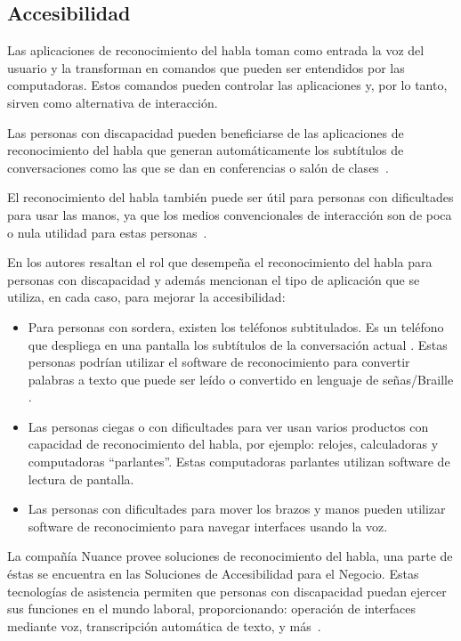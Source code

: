 \subsection{Accesibilidad}
\label{sec:accesibilidad}

Las aplicaciones de reconocimiento del habla toman como entrada la voz del usuario y la transforman en
comandos que pueden ser entendidos por las computadoras. Estos comandos pueden controlar las aplicaciones
y, por lo tanto, sirven como alternativa de interacci\'on.

Las personas con discapacidad pueden beneficiarse de las aplicaciones de reconocimiento del habla que
generan autom\'aticamente los subt\'itulos de conversaciones como las que se dan en conferencias o
sal\'on de \mbox{clases \cite{LeitchHow2002}.}

El reconocimiento del habla tambi\'en puede ser \'util para personas con dificultades para usar las manos, ya
que los medios convencionales de interacci\'on son de poca o nula utilidad para estas
\mbox{personas \cite{AnanthiSurvey2013}.}

En \cite{AnanthiSurvey2013} los autores resaltan el rol que desempe\~na el reconocimiento del habla para personas
con discapacidad y adem\'as mencionan el tipo de aplicaci\'on que se utiliza, en cada caso, para mejorar la accesibilidad:

\begin{itemize}
    \item Para personas con sordera, existen los tel\'efonos subtitulados. Es un tel\'efono que despliega en
	una pantalla los subt\'itulos de la conversaci\'on actual \cite{PerfettiReading2000}. Estas personas
	podr\'ian utilizar el software de reconocimiento para convertir palabras a texto que puede ser le\'ido o
	convertido en lenguaje de se\~nas/Braille \cite{SchilperoordNonverbatim2005}.
    \item Las personas ciegas o con dificultades para ver usan varios productos con capacidad de reconocimiento del habla,
	por ejemplo: relojes, calculadoras y computadoras ``parlantes''. Estas computadoras parlantes utilizan software
	de lectura de pantalla.
    \item Las personas con dificultades para mover los brazos y manos pueden utilizar software de reconocimiento para
	navegar interfaces usando la voz\cite{AnanthiSurvey2013}.
\end{itemize}

La compa\~n\'ia Nuance provee soluciones de reconocimiento del habla, una parte de \'estas se encuentra en las Soluciones de Accesibilidad
para el Negocio. Estas tecnolog\'ias de asistencia permiten que personas con discapacidad puedan ejercer sus funciones en el mundo laboral,
proporcionando: operaci\'on de interfaces mediante voz, transcripci\'on autom\'atica de texto,
y \mbox{m\'as \cite{NuanceAccessibility}.}
